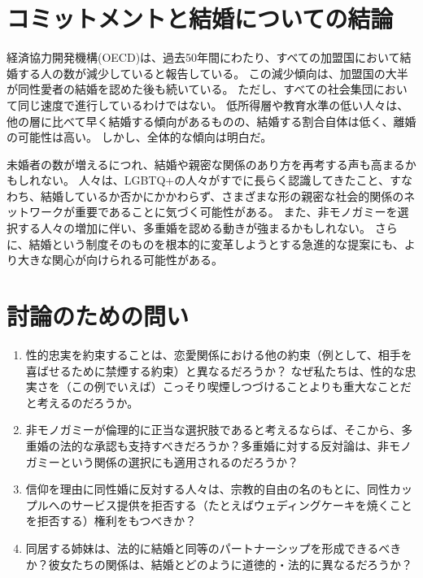 \documentclass[paper=a4,book,openany]{jlreq}
\begin{document}
\section{コミットメントと結婚についての結論}

経済協力開発機構(OECD)は、過去50年間にわたり、すべての加盟国において結婚する人の数が減少していると報告している\citep{oecd22:_marriag_divor_rates}。
この減少傾向は、加盟国の大半が同性愛者の結婚を認めた後も続いている。
ただし、すべての社会集団において同じ速度で進行しているわけではない。
低所得層や教育水準の低い人々は、他の層に比べて早く結婚する傾向があるものの、結婚する割合自体は低く、離婚の可能性は高い\citep{lundberg16:_famil_inequal}。
しかし、全体的な傾向は明白だ。

未婚者の数が増えるにつれ、結婚や親密な関係のあり方を再考する声も高まるかもしれない。
人々は、LGBTQ+の人々がすでに長らく認識してきたこと、すなわち、結婚しているか否かにかかわらず、さまざまな形の親密な社会的関係のネットワークが重要であることに気づく可能性がある。
また、非モノガミーを選択する人々の増加に伴い、多重婚を認める動きが強まるかもしれない。
さらに、結婚という制度そのものを根本的に変革しようとする急進的な提案にも、より大きな関心が向けられる可能性がある。

\section{討論のための問い}

\begin{enumerate}
\item 性的忠実を約束することは、恋愛関係における他の約束（例として、相手を喜ばせるために禁煙する約束）と異なるだろうか？ なぜ私たちは、性的な忠実さを（この例でいえば）こっそり喫煙しつづけることよりも重大なことだと考えるのだろうか。
\item 非モノガミーが倫理的に正当な選択肢であると考えるならば、そこから、多重婚の法的な承認も支持すべきだろうか？多重婚に対する反対論は、非モノガミーという関係の選択にも適用されるのだろうか？

\item 信仰を理由に同性婚に反対する人々は、宗教的自由の名のもとに、同性カップルへのサービス提供を拒否する（たとえばウェディングケーキを焼くことを拒否する）権利をもつべきか？
\item 同居する姉妹は、法的に結婚と同等のパートナーシップを形成できるべきか？彼女たちの関係は、結婚とどのように道徳的・法的に異なるだろうか？
\end{enumerate}
\end{document}
